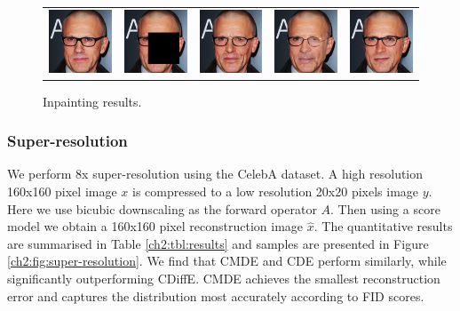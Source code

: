 \begin{figure}[ht]
\begin{center}
\begin{tabular}{ccccc}
        \includegraphics[width=.15\textwidth]{Chapter2/samples/inpainting/table/3/x.png} &   
        \includegraphics[width=.15\textwidth]{Chapter2/samples/inpainting/table/3/y.png} &
        \includegraphics[width=.15\textwidth]{Chapter2/samples/inpainting/table/3/sr3.png} & 
        \includegraphics[width=.15\textwidth]{Chapter2/samples/inpainting/table/3/Song.png} & 
        \includegraphics[width=.15\textwidth]{Chapter2/samples/inpainting/table/3/DV.png} \\
      \end{tabular}
      \endgroup
    \end{center}
    \caption{Inpainting results.}
    \label{ch2:fig:inpainting}
  \end{figure}
  

\subsubsection{Super-resolution}
We perform 8x super-resolution using the CelebA dataset. A high resolution 160x160 pixel image $x$ is compressed to a low resolution 20x20 pixels image $y$. Here we use bicubic downscaling \cite{keyes1981bicubic} as the forward operator  $A$. Then using a score model we obtain a 160x160 pixel reconstruction image $\hat{x}$. The quantitative results are summarised in Table \ref{ch2:tbl:results} and samples are presented in Figure \ref{ch2:fig:super-resolution}. We find that CMDE and CDE perform similarly, while significantly outperforming CDiffE. CMDE achieves the smallest reconstruction error and captures the distribution most accurately according to FID scores. 

